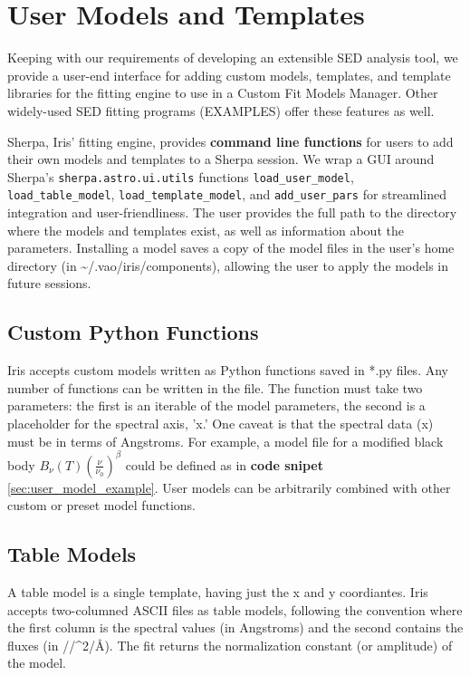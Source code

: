 \section{User Models and Templates}
\label{sec:usermodels}

Keeping with our requirements of developing an extensible SED analysis tool, we provide a user-end interface for adding custom models, templates, and template libraries for the fitting engine to use in a Custom Fit Models Manager. Other widely-used SED fitting programs (EXAMPLES) offer these features as well.

Sherpa, Iris' fitting engine, provides \textbf{command line functions} for users to add their own models and templates to a Sherpa session. We wrap a GUI around Sherpa's \texttt{sherpa.astro.ui.utils} functions \texttt{load\_user\_model}, \texttt{load\_table\_model}, \texttt{load\_template\_model}, and \texttt{add\_user\_pars} for streamlined integration and user-friendliness. The user provides the full path to the directory where the models and templates exist, as well as information about the parameters. Installing a model saves a copy of the model files in the user's home directory (in \~{}/.vao/iris/components), allowing the user to apply the models in future sessions.


\subsection{Custom Python Functions}
Iris accepts custom models written as Python functions saved in *.py files. Any number of functions can be written in the file. The function must take two parameters: the first is an iterable of the model parameters, the second is a placeholder for the spectral axis, 'x.' One caveat is that the spectral data (x) must be in terms of Angstroms. For example, a model file for a modified black body
\(B_{\nu}(T) \left(\frac{\nu}{\nu_{0}}\right)^{\beta}\)
could be defined as in \textbf{code snipet} \ref{sec:user_model_example}. User models can be arbitrarily combined with other custom or preset model functions.

\subsection{Table Models}
A table model is a single template, having just the x and y coordiantes. Iris accepts two-columned ASCII files as table models, following the convention where the first column is the spectral values (in Angstroms) and the second contains the fluxes (in //^{2}/\AA). The fit returns the normalization constant (or amplitude) of the model.

